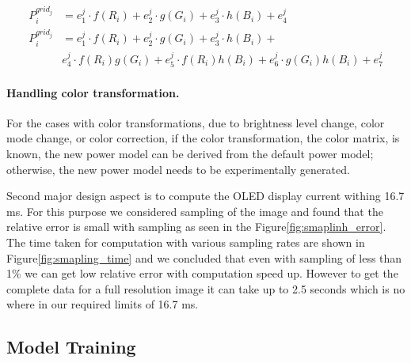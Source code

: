 \vspace{-0.1in}
{\small
  \begin{align}
	P^{grid_j}_i &= e_1^j\cdot f(R_i) + e_2^j\cdot g(G_i) + e_3^j\cdot h(B_i) + e_4^j
	\label{eq:first_order_variable} \\
  P^{grid_j}_i &= e_1^j\cdot f(R_i) + e_2^j\cdot g(G_i) + e_3^j\cdot h(B_i) + \label{eq:second_order_variable} \\
&  e_4^j\cdot f(R_i)g(G_i) +
  e_5^j\cdot f(R_i)h(B_i) +
  e_6^j\cdot g(G_i)h(B_i) +
  e_7^j \nonumber
\end{align}
}
\noindent

\vspace{-0.1in}
\paragraph{Handling color transformation.}
{For the cases with color transformations, \ie due to brightness level change,
color mode change, or color correction,
 if  the color transformation, \ie the color matrix, is known,
 the new power model can be derived from the default power model;
 otherwise, the new power model needs to be experimentally generated.
}

Second major design aspect is to compute the OLED display current withing
16.7 ms. For this purpose we considered sampling of the image and found that
the relative error is small with sampling as seen in the
Figure\ref{fig:smaplinh_error}. The time taken for computation with various
sampling rates are shown in Figure\ref{fig:smapling_time} and we concluded
that even with sampling of less than 1\% we can get low relative error with
computation speed up. However to get the complete data for a full resolution
image it can take up to 2.5 seconds which is no where in our required limits
of 16.7 ms.
\fi



\subsection{Model Training}

